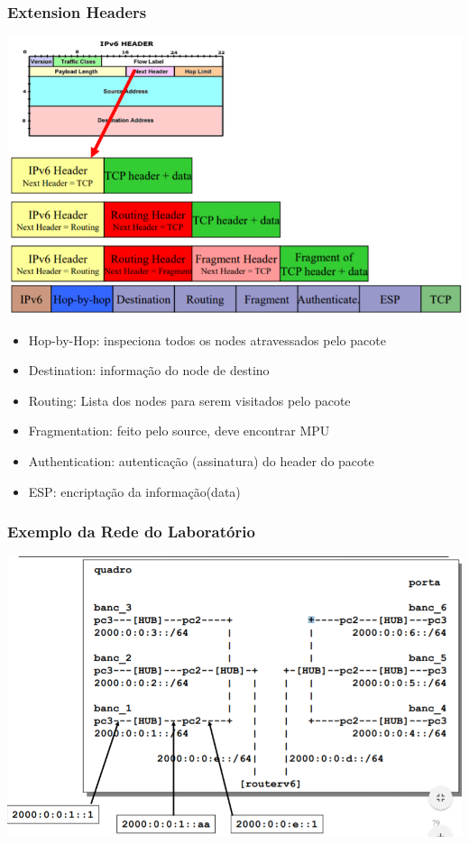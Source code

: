\documentclass[../resumosRCOM.tex]{subfiles}
\begin{document}
\subsubsection{Extension Headers}
\begin{center}
    \includegraphics[width=14cm]{images/RCOM38.png}
\end{center}
\begin{itemize}
    \item Hop-by-Hop: inspeciona todos os nodes atravessados pelo pacote
    \item Destination: informação do node de destino
    \item Routing: Lista dos nodes para serem visitados pelo pacote
    \item Fragmentation: feito pelo source, deve encontrar MPU
    \item Authentication: autenticação (assinatura) do header do pacote
    \item ESP: encriptação da informação(data)
\end{itemize}

\subsubsection{Exemplo da Rede do Laboratório}
\begin{center}
    \includegraphics[width=14cm]{images/RCOM39.png}
\end{center}
\end{document}
